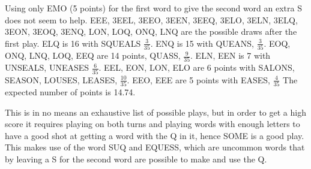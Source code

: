 \documentclass{article}
\begin{document}
Using only EMO (5 points) for the first word to give the second word an extra S does not seem to help.  EEE, 3EEL, 3EEO, 3EEN, 3EEQ, 3ELO, 3ELN, 3ELQ, 3EON, 3EOQ, 3ENQ, LON, LOQ, ONQ, LNQ are the possible draws after the first play.  ELQ is 16 with SQUEALS $\frac{3}{35}$. ENQ is 15 with QUEANS, $\frac{3}{35}$. EOQ, ONQ, LNQ, LOQ, EEQ are 14 points, QUASS,  $\frac{9}{35}$. ELN, EEN is 7 with UNSEALS, UNEASES $\frac{6}{35}$. EEL, EON, LON, ELO are 6 points with SALONS, SEASON, LOUSES, LEASES, $\frac{10}{35}$. EEO, EEE are 5 points with EASES, $\frac{4}{35}$
The expected number of points is 14.74. 

This is in no means an exhaustive list of possible plays, but in order to get a high score it requires playing on both turns and playing words with enough letters to have a good shot at getting a word with the Q in it, hence SOME is a good play. This makes use of the word SUQ and EQUESS, which are uncommon words that by leaving a S for the second word are possible to make and use the Q. 
\end{document}
